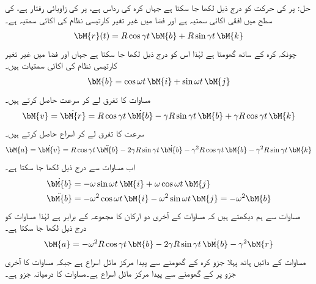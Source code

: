 حل: پر  کی حرکت کو درج ذیل لکھا جا سکتا ہے جہاں کرہ کی رداس  ہے،  پر  کی زاویائی رفتار  ہے،   کی سطح میں  افقی اکائی سمتیہ ہے اور  فضا میں غیر تغیر کارتیسی نظام کی اکائی سمتیہ ہے۔
\begin{align}\label{مساوات_الاحصاء_دو_گردش_الف}
\bM{r}(t)=R\cos \gamma t\,\bM{b}+R\sin \gamma t\,\bM{k}
\end{align}
چونکہ  کرہ کے ساتھ گھومتا ہے لہٰذا اس کو درج ذیل لکھا جا سکتا ہے جہاں  اور  فضا میں غیر تغیر کارتیسی نظام کی اکائی سمتیات ہیں۔
\begin{align}\label{مساوات_الاحصاء_دو_گردش_ب}
\bM{b}=\cos \omega t\,\bM{i}+\sin \omega t\,\bM{j}
\end{align}
مساوات  کا تفرق لے کر سرعت حاصل کرتے ہیں۔
\begin{align}\label{مساوات_الاحصاء_دو_گردش_پ}
\bM{v}=\dot{\bM{r}}=R\cos \gamma t \, \dot{\bM{b}}-\gamma R\sin \gamma t \, \bM{b}+\gamma R\cos \gamma t\,\bM{k}
\end{align}
سرعت کا تفرق لے کر اسراع حاصل کرتے ہیں۔
\begin{align}\label{مساوات_الاحصاء_دو_گردش_ت}
\bM{a}=\dot{\bM{v}}=R\cos \gamma t \,\ddot{\bM{b}}-2\gamma R\sin \gamma t\,\dot{\bM{b}}-\gamma^2 R\cos \gamma t\,\bM{b}-\gamma^2 R \sin \gamma t\,\bM{k}
\end{align}
اب مساوات  سے درج ذیل لکھا جا سکتا ہے۔
\begin{align*}
\dot{\bM{b}}&=-\omega \sin \omega t\,\bM{i}+\omega \cos \omega t\,\bM{j}\\
\ddot{\bM{b}}&=-\omega^2\cos \omega t\,\bM{i}-\omega^2\sin \omega t\,\bM{j}=-\omega^2\bM{b}
\end{align*}
مساوات  سے ہم دیکھتے ہیں کہ مساوات   کے آخری دو ارکان کا مجموعہ  کے برابر ہے لہٰذا مساوات  کو درج ذیل لکھا جا سکتا ہے۔
\begin{align}\label{مساوات_الاحصاء_دو_گردش_ٹ}
\bM{a}=-\omega^2R\cos \gamma t\,\bM{b}-2\gamma R\sin \gamma t \,\dot{\bM{b}}-\gamma^2\bM{r}
\end{align}
مساوات  کے دائیں ہاتھ پہلا جزو کرہ کے گھومنے سے پیدا مرکز مائل اسراع ہے جبکہ مساوات کا آخری جزو  پر  کے گھومنے  سے پیدا مرکز مائل اسراع ہے۔مساوات کا درمیانہ جزو     ہے۔
